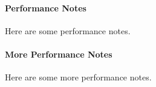 \documentclass[11pt]{report}
\begin{document}
\begin{titlepage}
\begin{multicols}{2}
\raggedcolumns
{}

{
    \paragraph{Performance Notes}

    Here are some performance notes.
} 

\columnbreak

{
    \paragraph{More Performance Notes}

    Here are some more performance notes.
}

\end{multicols}
\end{titlepage}
\end{document}
